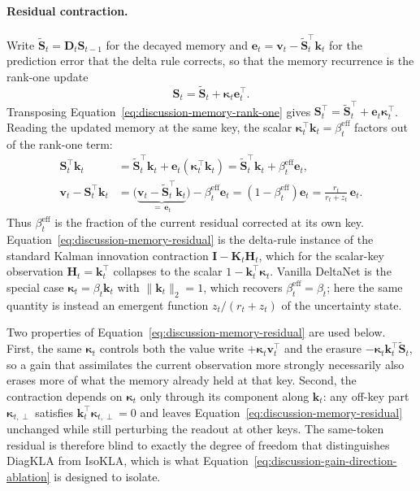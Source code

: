 \documentclass[11pt]{article}
\newcommand{\vct}[1]{\boldsymbol{#1}}
\begin{document}
\paragraph{Residual contraction.}
Write $\widetilde{\vct{S}}_t=\vct{D}_t\vct{S}_{t-1}$ for the decayed memory and
$\vct{e}_t=\vct{v}_t-\widetilde{\vct{S}}_t^\top\vct{k}_t$ for the prediction error that the delta
rule corrects, so that the memory recurrence is the rank-one update
\begin{equation}
  \vct{S}_t
  =\widetilde{\vct{S}}_t+\vct{\kappa}_t\vct{e}_t^\top.
  \label{eq:discussion-memory-rank-one}
\end{equation}
Transposing Equation~\eqref{eq:discussion-memory-rank-one} gives
$\vct{S}_t^\top=\widetilde{\vct{S}}_t^\top+\vct{e}_t\vct{\kappa}_t^\top$. Reading the updated
memory at the same key, the scalar $\vct{\kappa}_t^\top\vct{k}_t=\beta_t^{\mathrm{eff}}$ factors
out of the rank-one term:
\begin{align}
  \vct{S}_t^\top\vct{k}_t
  &=\widetilde{\vct{S}}_t^\top\vct{k}_t
    +\vct{e}_t\left(\vct{\kappa}_t^\top\vct{k}_t\right)
  =\widetilde{\vct{S}}_t^\top\vct{k}_t
    +\beta_t^{\mathrm{eff}}\vct{e}_t,
  \label{eq:discussion-memory-readout}
  \\
  \vct{v}_t-\vct{S}_t^\top\vct{k}_t
  &=\bigl(\underbrace{\vct{v}_t-\widetilde{\vct{S}}_t^\top\vct{k}_t}_{=\,\vct{e}_t}\bigr)
    -\beta_t^{\mathrm{eff}}\vct{e}_t
  =\left(1-\beta_t^{\mathrm{eff}}\right)\vct{e}_t
  =\frac{r_t}{r_t+z_t}\,\vct{e}_t.
  \label{eq:discussion-memory-residual}
\end{align}
Thus $\beta_t^{\mathrm{eff}}$ is the fraction of the current residual corrected at its own key.
Equation~\eqref{eq:discussion-memory-residual} is the delta-rule instance of the standard Kalman
innovation contraction $\vct{I}-\vct{K}_t\vct{H}_t$, which for the scalar-key observation
$\vct{H}_t=\vct{k}_t^\top$ collapses to the scalar $1-\vct{k}_t^\top\vct{\kappa}_t$. Vanilla
DeltaNet is the special case $\vct{\kappa}_t=\beta_t\vct{k}_t$ with
$\lVert\vct{k}_t\rVert_2=1$, which recovers $\beta_t^{\mathrm{eff}}=\beta_t$; here the same
quantity is instead an emergent function $z_t/(r_t+z_t)$ of the uncertainty state.

Two properties of Equation~\eqref{eq:discussion-memory-residual} are used below. First, the same
$\vct{\kappa}_t$ controls both the value write $+\vct{\kappa}_t\vct{v}_t^\top$ and the erasure
$-\vct{\kappa}_t\vct{k}_t^\top\widetilde{\vct{S}}_t$, so a gain that assimilates the current
observation more strongly necessarily also erases more of what the memory already held at that
key. Second, the contraction depends on $\vct{\kappa}_t$ only through its component along
$\vct{k}_t$: any off-key part $\vct{\kappa}_{t,\perp}$ satisfies
$\vct{k}_t^\top\vct{\kappa}_{t,\perp}=0$ and leaves
Equation~\eqref{eq:discussion-memory-residual} unchanged while still perturbing the readout at
other keys. The same-token residual is therefore blind to exactly the degree of freedom that
distinguishes DiagKLA from IsoKLA, which is what
Equation~\eqref{eq:discussion-gain-direction-ablation} is designed to isolate.
\end{document}

